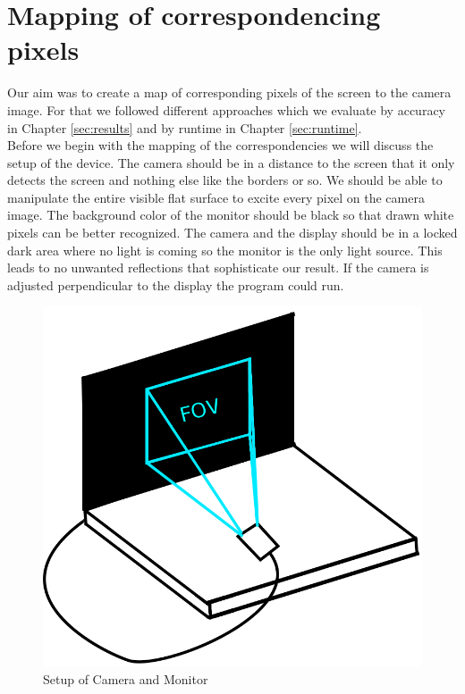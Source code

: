 \documentclass[journal,final,a4paper,twoside]{PS}
\begin{document}
\section{Mapping of correspondencing pixels}
\label{sec:mapping}
Our aim was to create a map of corresponding pixels of the screen to the camera image. For that we followed different approaches which we evaluate by accuracy in Chapter \ref{sec:results} and by runtime in Chapter \ref{sec:runtime}. \\
Before we begin with the mapping of the correspondencies we will discuss the setup of the device. The camera should be in a distance to the screen that it only detects the screen and nothing else like the borders or so. We should be able to manipulate the entire visible flat surface to excite every pixel on the camera image. The background color of the monitor should be black so that drawn white pixels can be better recognized. The camera and the display should be in a locked dark area where no light is coming so the monitor is the only light source. This leads to no unwanted reflections that sophisticate our result. If the camera is adjusted perpendicular to the display the program could run.
\begin{figure}[h]
\begin{center}
\includegraphics[scale=0.25]{./pics/setup.png}
\caption{Setup of Camera and Monitor}
\label{fig:setup}
\end{center}
\end{figure}\\
\end{document}
